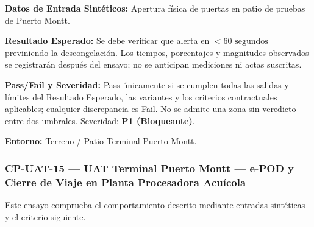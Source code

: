 \par\noindent\textbf{Datos de Entrada Sintéticos:} Apertura física de puertas en patio de pruebas de Puerto Montt.\par
\par\noindent\textbf{Resultado Esperado:} Se debe verificar que alerta en \(< 60\text{ segundos}\) previniendo la descongelación. Los tiempos, porcentajes y magnitudes observados se registrarán después del ensayo; no se anticipan mediciones ni actas suscritas.\par
\par\noindent\textbf{Pass/Fail y Severidad:} Pass únicamente si se cumplen todas las salidas y límites del Resultado Esperado, las variantes y los criterios contractuales aplicables; cualquier discrepancia es Fail. No se admite una zona sin veredicto entre dos umbrales. Severidad: \textbf{P1 (Bloqueante)}.\par
\par\noindent\textbf{Entorno:} Terreno / Patio Terminal Puerto Montt.\par


\subsubsection*{CP-UAT-15 — UAT Terminal Puerto Montt — e-POD y Cierre de Viaje en Planta Procesadora Acuícola}\label{sec:9-cp-uat-15}
Este ensayo comprueba el comportamiento descrito mediante entradas sintéticas y el criterio siguiente.

